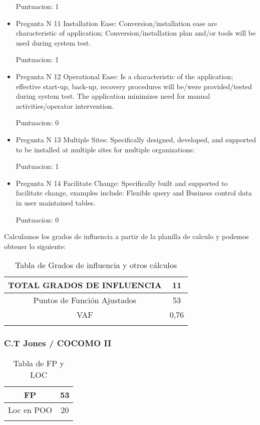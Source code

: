 \begin{itemize}
    Puntuacion: 1
    
    \item Pregunta N 11 Installation Ease: Conversion/installation ease are characteristic of application; Conversion/installation plan and/or tools will be used during system test.

    Puntuacion: 1
    
    \item Pregunta N 12 Operational Ease: Is a characteristic of the application; effective start-up, back-up, recovery procedures will be/were provided/tested during system test. The application minimizes need for manual activities/operator intervention.

    Puntuacion: 0
    
    \item Pregunta N 13 Multiple Sites: Specifically designed, developed, and supported to be installed at multiple sites for multiple organizations:

    Puntuacion: 1

    \item Pregunta N 14 Facilitate Change: Specifically built and supported to facilitate change, examples include:  Flexible query and Business control data in user maintained tables.

    Puntuacion: 0
   
   
   \end{itemize}
   Calculamos los grados de influencia a partir de la planilla de calculo y podemos obtener lo siguiente:
   
   \begin{longtable}{|c|c|}
   \hline 
   TOTAL GRADOS DE INFLUENCIA & 11 \\ 
   \hline 
   Puntos de Función Ajustados & 53 \\ 
   \hline 
   VAF & 0,76 \\ 
   \hline 
   \caption{Tabla de Grados de influencia y otros cálculos}
   \label{tab10}
   \end{longtable} 
   
\subsubsection{C.T Jones / COCOMO II}

\begin{longtable}{|c|c|}
\hline 
FP & 53 \\ 
\hline 
Loc en POO  & 20 \\ 
\hline 
\caption{Tabla de FP y LOC}
\label{tab11}
\end{longtable} 

